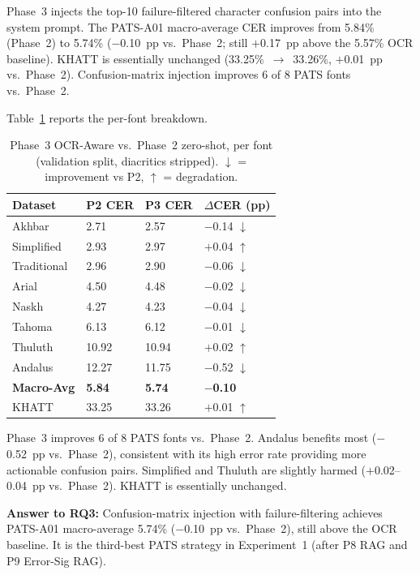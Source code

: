 Phase~3 injects the top-10 failure-filtered character confusion pairs into
the system prompt. The PATS-A01 macro-average CER improves from 5.84\%
(Phase~2) to 5.74\% ($-$0.10~pp vs.\ Phase~2; still $+$0.17~pp above the
5.57\% OCR baseline). KHATT is essentially unchanged (33.25\%~$\to$~33.26\%,
$+$0.01~pp vs.\ Phase~2). Confusion-matrix injection improves 6 of 8 PATS
fonts vs.\ Phase~2.

Table~\ref{tab:p3_per_font} reports the per-font breakdown.

\begin{table}[htbp]
  \centering
  \caption{Phase~3 OCR-Aware vs.\ Phase~2 zero-shot, per font (validation
           split, diacritics stripped). $\downarrow$ = improvement vs P2,
           $\uparrow$ = degradation.}
  \label{tab:p3_per_font}
  \begin{tabularx}{\textwidth}{lXXX}
    \toprule
    \textbf{Dataset} & \textbf{P2 CER} & \textbf{P3 CER}
      & \textbf{$\Delta$CER (pp)} \\
    \midrule
    Akhbar       &  2.71 &  2.57 & $-$0.14 $\downarrow$ \\
    Simplified   &  2.93 &  2.97 & $+$0.04 $\uparrow$ \\
    Traditional  &  2.96 &  2.90 & $-$0.06 $\downarrow$ \\
    Arial        &  4.50 &  4.48 & $-$0.02 $\downarrow$ \\
    Naskh        &  4.27 &  4.23 & $-$0.04 $\downarrow$ \\
    Tahoma       &  6.13 &  6.12 & $-$0.01 $\downarrow$ \\
    Thuluth      & 10.92 & 10.94 & $+$0.02 $\uparrow$ \\
    Andalus      & 12.27 & 11.75 & $-$0.52 $\downarrow$ \\
    \midrule
    \textbf{Macro-Avg} & \textbf{5.84} & \textbf{5.74} & \textbf{$-$0.10} \\
    \midrule
    KHATT        & 33.25 & 33.26 & $+$0.01 $\uparrow$ \\
    \bottomrule
  \end{tabularx}
\end{table}

Phase~3 improves 6 of 8 PATS fonts vs.\ Phase~2. Andalus benefits most
($-$0.52~pp vs.\ Phase~2), consistent with its high error rate providing more
actionable confusion pairs. Simplified and Thuluth are slightly harmed
($+$0.02--0.04~pp vs.\ Phase~2). KHATT is essentially unchanged.

\textbf{Answer to RQ3:} Confusion-matrix injection with failure-filtering
achieves PATS-A01 macro-average 5.74\% ($-$0.10~pp vs.\ Phase~2), still above
the OCR baseline. It is the third-best PATS strategy in Experiment~1 (after
P8 RAG and P9 Error-Sig RAG).

